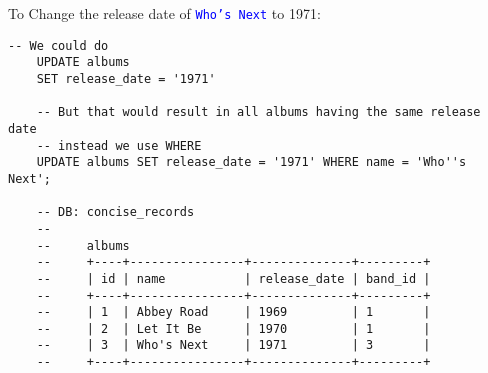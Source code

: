 \noindent
To Change the release date of \textcolor{blue}{\texttt{Who's Next} }to 1971:
\begin{lstlisting}[style=sql]
    -- We could do
    UPDATE albums
    SET release_date = '1971'

    -- But that would result in all albums having the same release date
    -- instead we use WHERE
    UPDATE albums SET release_date = '1971' WHERE name = 'Who''s Next';

    -- DB: concise_records
    --
    --     albums
    --     +----+----------------+--------------+---------+
    --     | id | name           | release_date | band_id |
    --     +----+----------------+--------------+---------+
    --     | 1  | Abbey Road     | 1969         | 1       |
    --     | 2  | Let It Be      | 1970         | 1       |
    --     | 3  | Who's Next     | 1971         | 3       |
    --     +----+----------------+--------------+---------+
\end{lstlisting}


